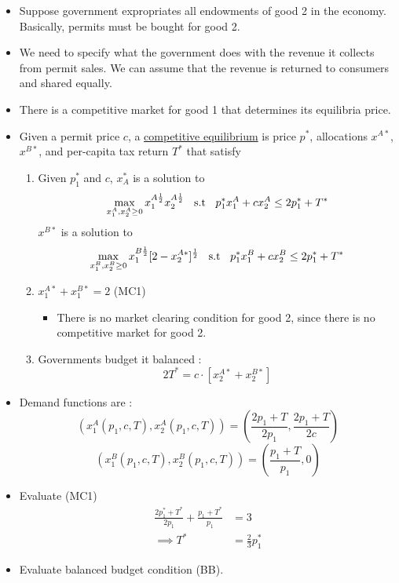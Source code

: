 \documentclass[twoside]{article}
\begin{document}
\begin{itemize}
\item Suppose government expropriates all endowments of good 2 in the economy. Basically, permits must be bought for good 2.
\item We need to specify what the government does with the revenue it collects from permit sales. We can assume that the revenue is returned to consumers and shared equally. 
\item There is a competitive market for good 1 that determines its equilibria price. 
\item Given a permit price \(c\), a \underline{competitive equilibrium} is price \(p^*\), allocations \(x^{A*}\), \(x^{B*}\), and per-capita tax return \(T^*\) that satisfy
\begin{enumerate}
\item Given \(p_1^*\) and \(c\), \(x_A^*\) is a solution to 
\[\max_{x_1^A, x_2^A \geq 0} x_1^{A \frac{1}{2}} x_2^{A \frac{1}{2}} \hspace{0.2cm} \text{ s.t } \hspace{0.2cm} p_1^* x_1^A + c x_2^A \leq 2p_1^* + T^*\]
\(x^{B*}\) is a solution to
\[\max_{x_1^B, x_2^B \geq 0} x_1^{B \frac{1}{2}} [2-x_2^{A*}]^{\frac{1}{2}} \hspace{0.2cm}  \text{ s.t } \hspace{0.2cm} p_1^* x_1^B + c x_2^B \leq 2p_1^* + T^*\]
\item \(x_1^{A*} + x_1^{B*} = 2\) (MC1)
\begin{itemize}
\item There is no market clearing condition for good 2, since there is no competitive market for good 2.
\end{itemize}
\item Governments budget it balanced : 
\[2T^* = c \cdot [x_2^{A*} + x_2^{B*}]\]
\end{enumerate}
\item Demand functions are : 
\[(x_1^A(p_1, c, T), x_2^A (p_1, c, T)) = \left( \frac{2p_1 + T}{2p_1}, \frac{2p_1 + T}{2c}
\right)\]
\[(x_1^B(p_1, c, T), x_2^B (p_1, c, T)) = \left( \frac{p_1 + T}{p_1} , 0 \right)\]
\item Evaluate (MC1) 
\[\begin{aligned}
\frac{2p_1^* + T^*}{2p_1} + \frac{p_1 + T^*}{p_1} & = 3\\
\implies T^* & = \frac{2}{3} p_1^*
\end{aligned}\]
\item Evaluate balanced budget condition (BB).

\end{itemize}
\end{document}
